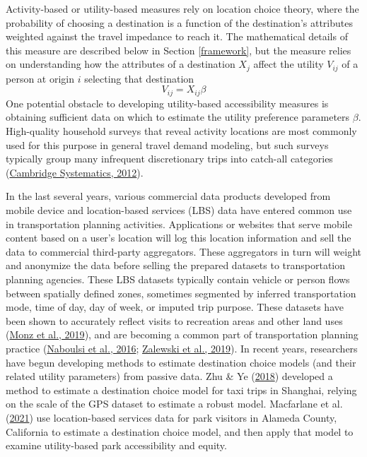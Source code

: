 \documentclass[review, 3p]{elsarticle} %
\begin{document}
Activity-based or utility-based measures rely on location choice theory, where
the probability of choosing a destination is a function of the destination's
attributes weighted against the travel impedance to reach it. The mathematical
details of this measure are described below in Section \ref{framework}, but the
measure relies on understanding how the attributes of a destination \(X_j\) affect
the utility \(V_{ij}\) of a person at origin \(i\) selecting that destination
\begin{equation}
V_{ij} = X_{ij}\beta
  \label{eq:simple-utility}
\end{equation}
One potential obstacle to developing utility-based accessibility measures is
obtaining sufficient data on which to estimate the utility preference parameters \(\beta\).
High-quality household surveys that reveal activity locations are most commonly
used for this purpose in general travel demand modeling, but such surveys typically
group many infrequent discretionary trips into catch-all categories (\protect\hyperlink{ref-nchrp716}{Cambridge Systematics, 2012}).

In the last several years, various commercial data products developed from
mobile device and location-based services (LBS) data have entered common use in
transportation planning activities. Applications or websites that serve mobile
content based on a user's location will log this location information and
sell the data to commercial third-party aggregators. These aggregators in turn will weight
and anonymize the data before selling the prepared datasets to transportation
planning agencies. These LBS datasets typically contain
vehicle or person flows between spatially defined zones, sometimes segmented by
inferred transportation mode, time of day, day of week, or imputed trip purpose.
These datasets have been shown to accurately reflect visits to recreation areas
and other land uses (\protect\hyperlink{ref-monz2019}{Monz et al., 2019}), and are becoming a common part of transportation
planning practice (\protect\hyperlink{ref-naboulsi2016}{Naboulsi et al., 2016}; \protect\hyperlink{ref-tcrp138}{Zalewski et al., 2019}). In recent years, researchers have
begun developing methods to estimate destination choice models (and their
related utility parameters) from passive data. Zhu \& Ye (\protect\hyperlink{ref-zhu2018}{2018}) developed a method to
estimate a destination choice model for taxi trips in Shanghai, relying on the
scale of the GPS dataset to estimate a robust model. Macfarlane et al. (\protect\hyperlink{ref-alamedaparks}{2021}) use
location-based services data for park visitors in Alameda County, California to
estimate a destination choice model, and then apply that model to examine
utility-based park accessibility and equity.
\end{document}
